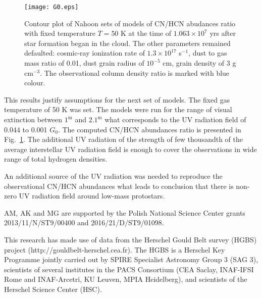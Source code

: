 \documentclass{aa}
\begin{document}
\begin{figure}
   \centering
   \texttt{[image: G0.eps]}
      \caption{Contour plot of Nahoon sets of models of CN/HCN abudances ratio with fixed temperature $T = 50$ K at the time of $1.063\times 10^{7}$ yrs after star formation began in the cloud. The other parameters remained defaulted: cosmic-ray ionization rate of $1.3\times 10^{17}$ s$^{-1}$, dust to gas mass ratio of 0.01, dust grain radius of $10^{-5}$ cm, grain density of 3 g cm$^{-3}$. The observational column density ratio is marked with blue colour.}
         \label{G0}
   \end{figure}

This results justify assumptions for the next set of models. The fixed gas temperature of 50 K was set. The models were run for the range of visual extinction between $1^{\mathrm{m}}$ and $2.1^{\mathrm{m}}$ what corresponds to the UV radiation field of 0.044 to 0.001 $G_0$. The computed CN/HCN abundances ratio is presented in Fig.~\ref{G0}. The additional UV radiation of the strength of few thousandth of the average interstellar UV radiation field is enough to cover the observations in wide range of total hydrogen densities. 

An additional source of the UV radiation was needed to reproduce the observational CN/HCN abundances what leads to conclusion that there is non-zero UV radiation field around low-mass protostars. 

\begin{acknowledgements}
AM, AK and MG are supported by the Polish National Science Center grants 2013/11/N/ST9/00400 and 2016/21/D/ST9/01098. 

This research has made use of data from the Herschel Gould Belt survey (HGBS) project (http://gouldbelt-herschel.cea.fr). The HGBS is a Herschel Key Programme jointly carried out by SPIRE Specialist Astronomy Group 3 (SAG 3), scientists of several institutes in the PACS Consortium (CEA Saclay, INAF-IFSI Rome and INAF-Arcetri, KU Leuven, MPIA Heidelberg), and scientists of the Herschel Science Center (HSC).
\end{acknowledgements}

%
%
\end{document}
